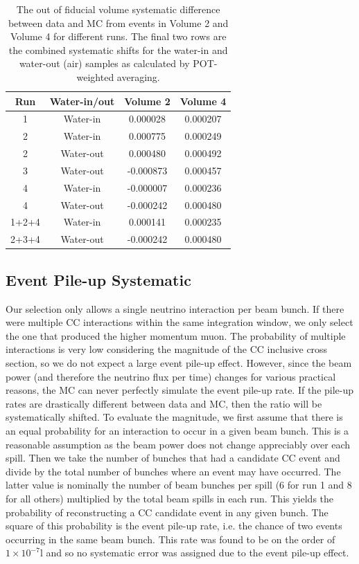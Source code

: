 \begin{table}[h]
\caption{The out of fiducial volume systematic difference between data and MC from events in Volume 2 and Volume 4 for different runs. The final two rows are the combined systematic shifts for the water-in and water-out (air) samples as calculated by POT-weighted averaging.}
\label{tab:oofv}
\centering
\begin{tabular}{cccc}
\toprule
Run & Water-in/out & Volume 2 & Volume 4 \\
\midrule
1 & Water-in & 0.000028 & 0.000207\\
2 & Water-in & 0.000775 & 0.000249\\
2 & Water-out & 0.000480 & 0.000492\\
3 & Water-out & -0.000873 & 0.000457\\
4 & Water-in & -0.000007 & 0.000236\\
4 & Water-out & -0.000242 & 0.000480 \\
1+2+4 & Water-in & 0.000141 & 0.000235 \\
2+3+4 & Water-out & -0.000242 & 0.000480 \\
\bottomrule
\end{tabular}
\end{table}

\subsection{Event Pile-up Systematic}

Our selection only allows a single neutrino interaction per beam bunch. If there were multiple CC interactions within the same integration window, we only select the one that produced the higher momentum muon. The probability of multiple interactions is very low considering the magnitude of the CC inclusive cross section, so we do not expect a large event pile-up effect. However, since the beam power (and therefore the neutrino flux per time) changes for various practical reasons, the MC can never perfectly simulate the event pile-up rate. If the pile-up rates are drastically different between data and MC, then the ratio will be systematically shifted. To evaluate the magnitude, we first assume that there is an equal probability for an interaction to occur in a given beam bunch. This is a reasonable assumption as the beam power does not change appreciably over each spill. Then we take the number of bunches that had a candidate CC event and divide by the total number of bunches where an event may have occurred. The latter value is nominally the number of beam bunches per spill (6 for run 1 and 8 for all others) multiplied by the total beam spills in each run. This yields the probability of reconstructing a CC candidate event in any given bunch. The square of this probability is the event pile-up rate, i.e. the chance of two events occurring in the same beam bunch. This rate was found to be on the order of $1\times 10^{-7}$l and so no systematic error was assigned due to the event pile-up effect.

